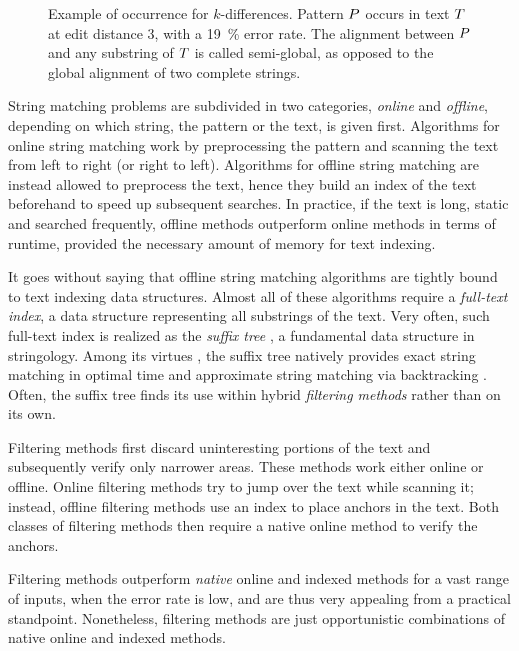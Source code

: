 \begin{figure}[t]
\begin{center}
\caption[Example of occurrence for $k$-differences]{Example of occurrence for $k$-differences. Pattern $P$ occurs in text $T$ at edit distance 3, \ie with a 19~\% error rate.
The alignment between $P$ and any substring of $T$ is called semi-global, as opposed to the global alignment of two complete strings.
}
\label{fig:edit-occurrence}

\end{center}
\end{figure}

String matching problems are subdivided in two categories, \emph{online} and \emph{offline}, depending on which string, the pattern or the text, is given first.
Algorithms for online string matching work by preprocessing the pattern and scanning the text from left to right (or right to left).
Algorithms for offline string matching are instead allowed to preprocess the text,
hence they build an index of the text beforehand to speed up subsequent searches.
In practice, if the text is long, static and searched frequently, offline methods outperform online methods in terms of runtime, provided the necessary amount of memory for text indexing.

It goes without saying that offline string matching algorithms are tightly bound to text indexing data structures.
Almost all of these algorithms require a \emph{full-text index}, \ie a data structure representing all substrings of the text.
Very often, such full-text index is realized as the \emph{suffix tree} \citep{Weiner1973}, a fundamental data structure in stringology.
Among its virtues \citep{Apostolico1985}, the suffix tree natively provides exact string matching in optimal time and approximate string matching via backtracking \citep{Ukkonen1993}.
Often, the suffix tree finds its use within hybrid \emph{filtering methods} rather than on its own.

Filtering methods first discard uninteresting portions of the text and subsequently verify only narrower areas.
These methods work either online or offline.
Online filtering methods try to jump over the text while scanning it; instead, offline filtering methods use an index to place anchors in the text.
Both classes of filtering methods then require a native online method to verify the anchors.

Filtering methods outperform \emph{native} online and indexed methods for a vast range of inputs, \ie when the error rate is low, and are thus very appealing from a practical standpoint.
Nonetheless, filtering methods are just opportunistic combinations of native online and indexed methods.

